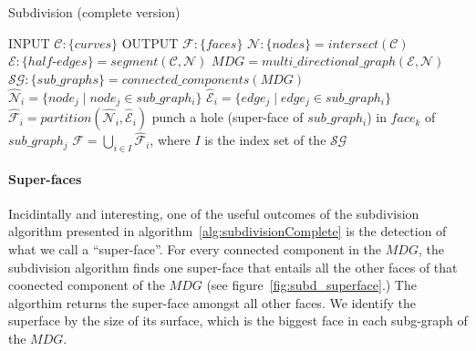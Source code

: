 \begin{algorithm}
  \caption {Subdivision (complete version)}
  \label{alg:subdivisionComplete}
  \begin{algorithmic}
    \STATE INPUT  $\mathcal{C}:\{curves\}$
    \STATE OUTPUT  $\mathcal{F}:\{faces\}$
    \STATE \quad
    \STATE $\mathcal{N}:\{nodes\} = \mathit{intersect} \left( \mathcal{C} \right)$
    \STATE $\mathcal{E}:\{half\text{-}edges\} = \mathit{segment} \left( \mathcal{C}, \mathcal{N} \right)$
    \STATE $\mathit{MDG}= \mathit{multi\_directional\_graph} \left( \mathcal{E}, \mathcal{N} \right)$
    \STATE $\mathcal{SG}:\{sub\_graphs\} = connected\_components(\mathit{MDG})$
    \STATE \quad
    \STATE $ \hat{\mathcal{N}}_i = \{node_j \mid node_j \in sub\_graph_i \} $
    \STATE $ \hat{\mathcal{E}}_i = \{edge_j \mid edge_j \in sub\_graph_i \} $
    \STATE $ \hat{\mathcal{F}}_i= \mathit{partition} \left( \hat{\mathcal{N}}_i, \hat{\mathcal{E}}_i \right)$
    \ENDFOR
    \STATE \quad
    \STATE punch a hole (super-face of $sub\_graph_i$) in $face_k$ of $sub\_graph_j$ 
    \ENDIF
    \ENDFOR
    \STATE \quad
    \STATE $ \mathcal{F} = \displaystyle \bigcup_{i\in I} \hat{\mathcal{F}}_i $, \quad where $I$ is the index set of the $\mathcal{SG}$
  \end{algorithmic}
\end{algorithm}


\paragraph{Super-faces}
Incidintally and interesting, one of the useful outcomes of the subdivision algorithm presented in algorithm~\ref{alg:subdivisionComplete} is the detection of what we call a ``super-face''.
For every connected component in the $\mathit{MDG}$, the subdivision algorithm finds one super-face that entails all the other faces of that coonected component of the $\mathit{MDG}$ (see figure~\ref{fig:subd_superface}.)
The algorthim returns the super-face amongst all other faces.
We identify the superface by the size of its surface, which is the biggest face in each subg-graph of the $\mathit{MDG}$.

